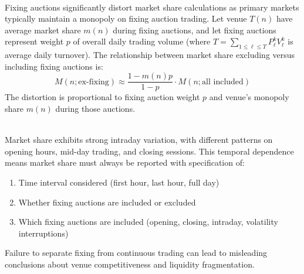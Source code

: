 \begin{definition} \\
Fixing auctions significantly distort market share calculations as primary markets typically maintain a monopoly on fixing auction trading. Let venue $T(n)$ have average market share $m(n)$ during fixing auctions, and let fixing auctions represent weight $p$ of overall daily trading volume (where $T = \sum_{1 \leq \ell \leq T} P_\ell^k V_\ell^k$ is average daily turnover). The relationship between market share excluding versus including fixing auctions is:
\begin{equation*}
M(n; \text{ex-fixing}) \approx \frac{1 - m(n)p}{1 - p} \cdot M(n; \text{all included})
\end{equation*}
The distortion is proportional to fixing auction weight $p$ and venue's monopoly share $m(n)$ during those auctions.
\end{definition}

\begin{remark} \\
Market share exhibits strong intraday variation, with different patterns on opening hours, mid-day trading, and closing sessions. This temporal dependence means market share must always be reported with specification of:
\begin{enumerate}[label=\roman*.]
\setlength{\itemsep}{0pt}
\item Time interval considered (first hour, last hour, full day)
\item Whether fixing auctions are included or excluded
\item Which fixing auctions are included (opening, closing, intraday, volatility interruptions)
\end{enumerate}
Failure to separate fixing from continuous trading can lead to misleading conclusions about venue competitiveness and liquidity fragmentation.
\end{remark}

